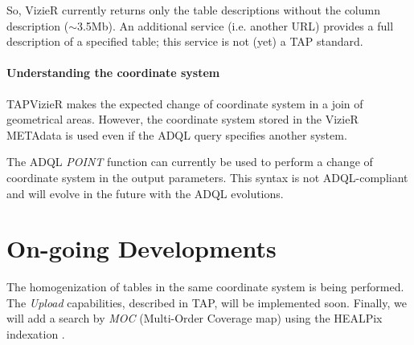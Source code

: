 So, VizieR currently returns only the table descriptions without the 
column description ($\sim$3.5Mb). 
An additional service (i.e. another URL) provides a full
description of a specified table; this service is not (yet) a TAP standard.

\paragraph{Understanding the coordinate system}

TAPVizieR makes the expected change of coordinate system in a join of 
geometrical  areas. However, the coordinate system stored in the VizieR 
METAdata is used even if the ADQL query specifies another system.

The ADQL {\em POINT} function can currently be used %
to perform a change of coordinate system in the output parameters.
This syntax is not ADQL-compliant and  will evolve in the future with
the ADQL evolutions.

\section{On-going Developments}

The homogenization of tables in the same coordinate system is being performed. %
The {\em Upload} capabilities, described in TAP, will be implemented soon.
Finally, we will add a search by {\em MOC}  (Multi-Order Coverage map) 
using the HEALPix indexation \citep{O13_adassxxii}.


